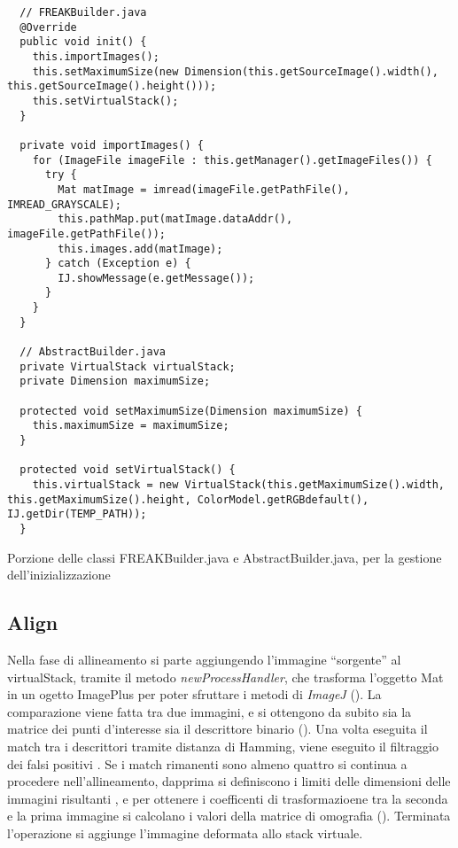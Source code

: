 \begin{listing}[H]
\begin{verbatim}
  // FREAKBuilder.java
  @Override
  public void init() {
    this.importImages();
    this.setMaximumSize(new Dimension(this.getSourceImage().width(), this.getSourceImage().height()));
    this.setVirtualStack();
  }

  private void importImages() {
    for (ImageFile imageFile : this.getManager().getImageFiles()) {
      try {
        Mat matImage = imread(imageFile.getPathFile(), IMREAD_GRAYSCALE);
        this.pathMap.put(matImage.dataAddr(), imageFile.getPathFile());
        this.images.add(matImage);
      } catch (Exception e) {
        IJ.showMessage(e.getMessage());
      }
    }
  }

  // AbstractBuilder.java 
  private VirtualStack virtualStack;
  private Dimension maximumSize;

  protected void setMaximumSize(Dimension maximumSize) {
    this.maximumSize = maximumSize;
  }

  protected void setVirtualStack() {
    this.virtualStack = new VirtualStack(this.getMaximumSize().width, this.getMaximumSize().height, ColorModel.getRGBdefault(), IJ.getDir(TEMP_PATH));
  }
\end{verbatim}
\caption{Porzione delle classi FREAKBuilder.java e AbstractBuilder.java, per la gestione dell'inizializzazione}\label{lst:init}
\end{listing}

\subsection{Align}
\noindent Nella fase di allineamento  si parte aggiungendo l'immagine ``sorgente'' al virtualStack, tramite il metodo \textit{newProcessHandler}, che trasforma l'oggetto Mat in un ogetto ImagePlus per poter sfruttare i metodi di \textit{ImageJ} (). La comparazione viene fatta tra due immagini, e si ottengono da subito sia la matrice dei punti d'interesse sia il descrittore binario (). Una volta eseguita il match tra i descrittori tramite distanza di Hamming, viene eseguito il filtraggio dei falsi positivi . Se i match rimanenti sono almeno quattro si continua a procedere nell'allineamento, dapprima si definiscono i limiti delle dimensioni delle immagini risultanti , e per ottenere i coefficenti di trasformazioene tra la seconda e la prima immagine si calcolano i valori della matrice di omografia (). Terminata l'operazione si aggiunge l'immagine deformata allo stack virtuale.

